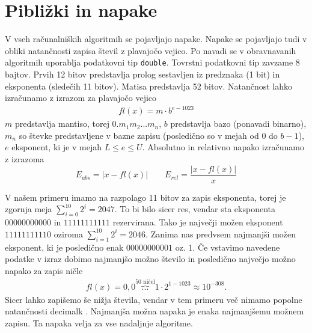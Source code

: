 \newpage
\section{Pibližki in napake}
V vseh računalniških algoritmih se pojavljajo napake. Napake se pojavljajo tudi v obliki natančnosti zapisa števil z plavajočo vejico. Po navadi se v obravnavanih algoritmih uporablja podatkovni tip \texttt{double}. Tovrstni podatkovni tip zavzame 8 bajtov. Prvih 12 bitov predstavlja prolog sestavljen iz predznaka (1 bit) in eksponenta (sledečih 11 bitov). Matisa predstavlja 52 bitov. Natančnost lahko izračunamo z izrazom za plavajočo vejico \cite{Ridgway2011}
\begin{align}
    fl(x) = m \cdot b^{e-1023}
\end{align}
$m$ predstavlja mantiso, torej $0.m_1m_2...m_n$, $b$ predstavlja bazo (ponavadi binarno),  $m_n$ so števke predstavljene v bazne zapisu (posledično so v mejah od 0 do $b-1$), $e$ eksponent, ki je v mejah $L \le e \le U$. Absolutno in relativno napako izračunamo z izrazoma
\[
 E_{abs} = |x - fl(x)| \qquad E_{rel} = \frac{|x - fl(x)|}{x}
\]

V našem primeru imamo na razpolago 11 bitov za zapis eksponenta, torej je zgornja meja $\sum_{i=0}^{10} 2^i = 2047$. To bi bilo sicer res, vendar sta eksponenta $00000000000$ in $11111111111$ \cite{8766229} rezervirana. Tako je največji možen eksponent $11111111110$ oziroma $\sum_{i=1}^{10} 2^i = 2046$. Zanima nas predvsem najmanjši možen eksponent, ki je posledično enak $00000000001$ oz. 1. Če vstavimo navedene podatke v izraz dobimo najmanjšo možno število in posledično največjo možno napako za zapis ničle
\begin{align}
    fl(x) = 0,0\overbrace{...}^{\text{50 ničel}}1\cdot 2^{1-1023} \approx 10^{-308}.
\end{align}
Sicer lahko zapišemo še nižja števila, vendar v tem primeru več nimamo popolne natančnosti decimalk \cite{quadiblocFloatingPointFormats}. Najmanjša možna napaka je enaka najmanjšemu možnem zapisu. Ta napaka velja za vse nadaljnje algoritme.